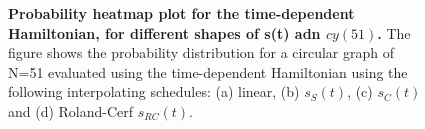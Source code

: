 \begin{figure}[ht]
  \caption[Probability heatmap plot for the time-dependent Hamiltonian, for different shapes of s(t)]{\textbf{Probability heatmap plot for the time-dependent Hamiltonian, for different shapes of s(t) adn $cy(51)$.} The figure shows the probability distribution for a circular graph of N=51 evaluated using the time-dependent Hamiltonian using the following interpolating schedules: (a) linear, (b) $s_S(t)$, (c) $s_C(t)$ and (d) Roland-Cerf $s_{RC}(t)$.}
  \label{fig:heatmap-dependent}
\end{figure}
